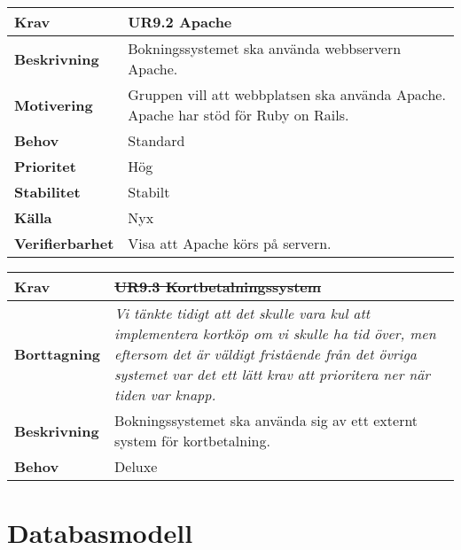 \documentclass[a4paper, twoside, 11pt, titlepage]{article}
\begin{document}
		\begin {table} [ht] \begin{tabular} { p{2.6cm} p{12.5cm} }
			\hline
			{\sffamily\textbf{Krav}} & {\sffamily\textbf{UR9.2 Apache}} \\
			\hline
			{\sffamily\textbf{Beskrivning}} & {Bokningssystemet ska använda webbservern Apache.} \\
			\hline
			{\sffamily\textbf{Motivering}} & {Gruppen vill att webbplatsen ska använda Apache. Apache har stöd för Ruby on Rails.} \\
			\hline
			{\sffamily\textbf{Behov}} & {Standard} \\
			\hline
			{\sffamily\textbf{Prioritet}} & {Hög} \\
			\hline
			{\sffamily\textbf{Stabilitet}} & {Stabilt} \\
			\hline
			{\sffamily\textbf{Källa}} & {Nyx} \\
			\hline
			{\sffamily\textbf{Verifierbarhet}} & {Visa att Apache körs på servern.} \\
			\hline
		\end{tabular} \end{table} \FloatBarrier
		\vspace{6mm}

		\begin {table} [ht] \begin{tabular} { p{2.6cm} p{12.5cm} }
			\hline
			{\sffamily\textbf{Krav}} & {\sffamily\textbf{\sout{UR9.3 Kortbetalningssystem}}} \\
			\hline
			{\sffamily\textbf{Borttagning}} & {\emph{Vi tänkte tidigt att det skulle vara kul att implementera kortköp om vi skulle ha tid över, men eftersom det är väldigt fristående från det övriga systemet var det ett lätt krav att prioritera ner när tiden var knapp.}} \\
			\hline
			{\sffamily\textbf{Beskrivning}} & {Bokningssystemet ska använda sig av ett externt system för kortbetalning.} \\
			\hline
			{\sffamily\textbf{Behov}} & {Deluxe} \\
			\hline
		\end{tabular} \end{table} \FloatBarrier


\clearpage
	\appendix

\clearpage
\section{Databasmodell}
\end{document}
